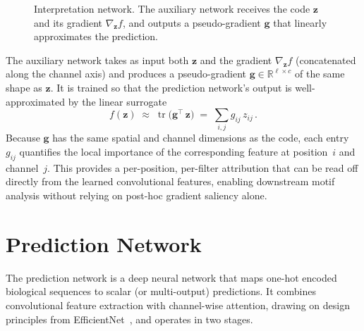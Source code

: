 \documentclass[11pt]{article}
\begin{document}
\begin{figure}[ht]
\caption{Interpretation network. The auxiliary network receives the code
$\mathbf{z}$ and its gradient $\nabla_{\mathbf{z}} f$, and outputs a
pseudo-gradient $\mathbf{g}$ that linearly approximates the prediction.}
\label{fig:interp-net}
\end{figure}

The auxiliary network takes as input both $\mathbf{z}$ and the gradient
$\nabla_{\mathbf{z}} f$ (concatenated along the channel axis) and produces a
pseudo-gradient $\mathbf{g} \in \mathbb{R}^{\ell \times c}$ of the same shape
as $\mathbf{z}$.  It is trained so that the prediction network's output is
well-approximated by the linear surrogate
\begin{equation}
  f(\mathbf{z}) \;\approx\; \operatorname{tr}\!\bigl(\mathbf{g}^{\!\top}\,
  \mathbf{z}\bigr)
  \;=\; \sum_{i,j} g_{ij}\, z_{ij}\,.
\end{equation}
Because $\mathbf{g}$ has the same spatial and channel dimensions as the code,
each entry $g_{ij}$ quantifies the local importance of the corresponding feature
at position~$i$ and channel~$j$.  This provides a per-position, per-filter
attribution that can be read off directly from the learned convolutional
features, enabling downstream motif analysis without relying on post-hoc
gradient saliency alone.

\section{Prediction Network}

The prediction network is a deep neural network that maps one-hot encoded
biological sequences to scalar (or multi-output) predictions.  It combines
convolutional feature extraction with channel-wise attention, drawing on
design principles from EfficientNet~\cite{tan2019efficientnet,tan2021efficientnetv2},
and operates in two stages.
\end{document}
